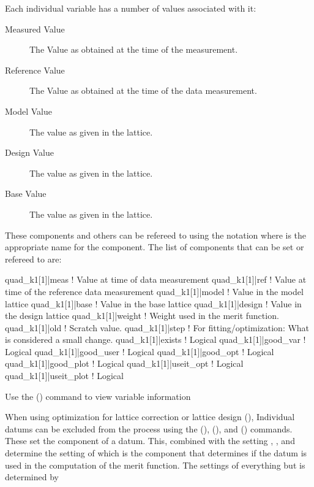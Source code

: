 Each individual variable has a number of values associated with it:
  \vspace*{-3ex}
  \begin{description}
  \item[Measured Value] \Newline
The Value as obtained at the time of the  measurement.
  \item[Reference Value] \Newline
The Value as obtained at the time of the  data  measurement.
  \item[Model Value] \Newline
The value as given in the  lattice.
  \item[Design Value] \Newline
The value as given in the  lattice.
  \item[Base Value] \Newline
The value as given in the  lattice.
  \end{description}
These components and others can be refereed to using the notation
 where  is the appropriate name for the
component. The list of components that can be set or refereed to are:
\begin{example}
  quad_k1[1]|meas       ! Value at time of data measurement
  quad_k1[1]|ref        ! Value at time of the reference data measurement
  quad_k1[1]|model      ! Value in the model lattice
  quad_k1[1]|base       ! Value in the base lattice
  quad_k1[1]|design     ! Value in  the design lattice
  quad_k1[1]|weight     ! Weight used in the merit function.
  quad_k1[1]|old        ! Scratch value.
  quad_k1[1]|step       ! For fitting/optimization: What is considered a small change.
  quad_k1[1]|exists     ! Logical
  quad_k1[1]|good_var   ! Logical
  quad_k1[1]|good_user  ! Logical
  quad_k1[1]|good_opt   ! Logical
  quad_k1[1]|good_plot  ! Logical
  quad_k1[1]|useit_opt  ! Logical
  quad_k1[1]|useit_plot ! Logical

\end{example}

Use the  () command to view variable information

When using optimization for lattice correction or lattice design
(), Individual datums can be excluded from the process
using the  (),  (),
and  () commands. These set the 
component of a datum. This, combined with the setting ,
, and  determine the setting of
 which is the component that determines if the datum is
used in the computation of the merit function. The settings of
everything but  is determined by \tao


